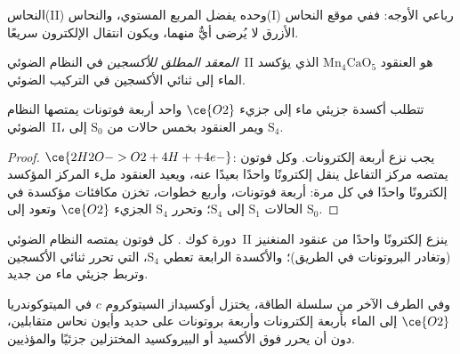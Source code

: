 النحاس(II) وحده يفضل المربع المستوي، والنحاس(I) رباعي الأوجه: ففي موقع النحاس
الأزرق لا يُرضى أيٌّ منهما، ويكون انتقال الإلكترون سريعًا.

\begin{definition}\label{def:b3:bioinorganic:oec}
\emph{المعقد المطلق للأكسجين} في
النظام الضوئي~II هو العنقود $\mathrm{Mn_4CaO_5}$ الذي يؤكسد الماء إلى ثنائي الأكسجين في
التركيب الضوئي.
\end{definition}

\begin{proposition}\label{prop:b3:bioinorganic:kok}
تتطلب أكسدة جزيئي ماء إلى جزيء $\ce{O2}$ واحد أربعة فوتونات يمتصها
النظام الضوئي~II، ويمر العنقود بخمس حالات من $\mathrm S_0$ إلى $\mathrm S_4$.
\end{proposition}

\begin{proof}
$\ce{2H2O -> O2 + 4H+ + 4e-}$: يجب نزع أربعة إلكترونات. وكل فوتون يمتصه
مركز التفاعل ينقل إلكترونًا واحدًا بعيدًا عنه، ويعيد العنقود ملء
المركز المؤكسد إلكترونًا واحدًا في كل مرة: أربعة فوتونات، وأربع خطوات، تخزن
مكافئات مؤكسدة في الحالات $\mathrm S_1$ إلى $\mathrm S_4$؛ وتحرر $\mathrm S_4$ الجزيء $\ce{O2}$ وتعود إلى $\mathrm S_0$.
\end{proof}

\begin{omfigure}

{\small دورة كوك . كل فوتون يمتصه
النظام الضوئي~II ينزع إلكترونًا واحدًا من عنقود المنغنيز (وتغادر البروتونات
في الطريق)؛ والأكسدة الرابعة تعطي $\mathrm S_4$، التي تحرر ثنائي الأكسجين 
وتربط جزيئي ماء من جديد.}
\end{omfigure}

وفي الطرف الآخر من سلسلة الطاقة، يختزل أوكسيداز السيتوكروم $c$ في
الميتوكوندريا $\ce{O2}$ إلى الماء بأربعة إلكترونات وأربعة بروتونات على
حديد  وأيون نحاس متقابلين، دون أن يحرر فوق الأكسيد أو البيروكسيد
المختزلين جزئيًا والمؤذيين.

